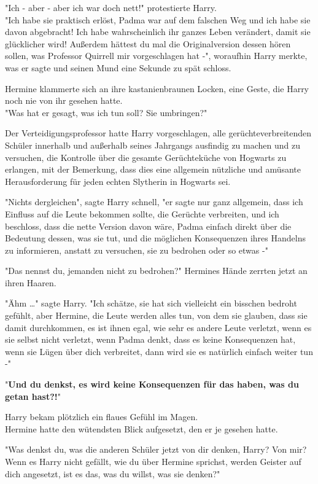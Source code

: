 {"Ich - aber - aber ich war doch nett!" protestierte Harry.\\ "Ich habe sie praktisch erlöst, Padma war auf dem falschen Weg und ich habe sie davon abgebracht! Ich habe wahrscheinlich ihr ganzes Leben verändert, damit sie glücklicher wird! Außerdem hättest du mal die Originalversion dessen hören sollen, was Professor Quirrell mir vorgeschlagen hat -", woraufhin Harry merkte, was er sagte und seinen Mund eine Sekunde zu spät schloss.

Hermine klammerte sich an ihre kastanienbraunen Locken, eine Geste, die Harry noch nie von ihr gesehen hatte.\\ "Was hat er gesagt, was ich tun soll? Sie umbringen?"

Der Verteidigungsprofessor hatte Harry vorgeschlagen, alle gerüchteverbreitenden Schüler innerhalb und außerhalb seines Jahrgangs ausfindig zu machen und zu versuchen, die Kontrolle über die gesamte Gerüchteküche von Hogwarts zu erlangen, mit der Bemerkung, dass dies eine allgemein nützliche und amüsante Herausforderung für jeden echten Slytherin in Hogwarts sei.

"Nichts dergleichen", sagte Harry schnell, "er sagte nur ganz allgemein, dass ich Einfluss auf die Leute bekommen sollte, die Gerüchte verbreiten, und ich beschloss, dass die nette Version davon wäre, Padma einfach direkt über die Bedeutung dessen, was sie tut, und die möglichen Konsequenzen ihres Handelns zu informieren, anstatt zu versuchen, sie zu bedrohen oder so etwas -"

"Das nennst du, jemanden nicht zu bedrohen?" Hermines Hände zerrten jetzt an ihren Haaren.

"Ähm …" sagte Harry. "Ich schätze, sie hat sich vielleicht ein bisschen bedroht gefühlt, aber Hermine, die Leute werden alles tun, von dem sie glauben, dass sie damit durchkommen, es ist ihnen egal, wie sehr es andere Leute verletzt, wenn es sie selbst nicht verletzt, wenn Padma denkt, dass es keine Konsequenzen hat, wenn sie Lügen über dich verbreitet, dann wird sie es natürlich einfach weiter tun -"

"\textbf{Und du denkst, es wird keine Konsequenzen für das haben, was du getan hast?!}"

Harry bekam plötzlich ein flaues Gefühl im Magen.\\ Hermine hatte den wütendsten Blick aufgesetzt, den er je gesehen hatte.

"Was denkst du, was die anderen Schüler jetzt von dir denken, Harry? Von mir? Wenn es Harry nicht gefällt, wie du über Hermine sprichst, werden Geister auf dich angesetzt, ist es das, was du willst, was sie denken?"

}
